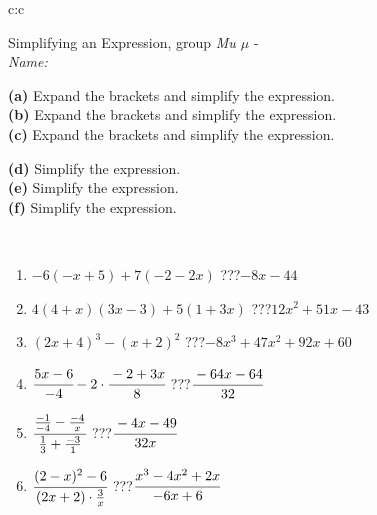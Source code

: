 \documentclass[10pt]{report}
\begin{document}
\newpage
\thispagestyle{empty}
\begin{tabular}{c:c}
\begin{minipage}[c][104.5mm][t]{0.5\linewidth}
\begin{center}
\vspace{7mm}
{\huge Simplifying an Expression, group \textit{Mu $\mu$} -}\\[5mm]
\textit{Name:}\phantom{xxxxxxxxxxxxxxxxxxxxxxxxxxxxxxxxxxxxxxxxxxxxxxxxxxxxxxxxxxxxxxxxx}\\[5mm]
\begin{minipage}{0.95\linewidth}
\begin{center}
{\small \begin{minipage}{0.6\textwidth}
\textbf{(a)} Expand the brackets and simplify the expression. \\[1mm]
\textbf{(b)} Expand the brackets and simplify the expression. \\[1mm]
\textbf{(c)} Expand the brackets and simplify the expression.
\end{minipage} \begin{minipage}{0.39\textwidth}
\textbf{(d)} Simplify the expression. \\[1mm]
\textbf{(e)} Simplify the expression. \\[1mm]
\textbf{(f)} Simplify the expression.
\end{minipage}
}
\end{center}
\end{minipage}
\\[4mm]
\begin{minipage}{0.79\linewidth}
\begin{center}
\begin{varwidth}{\linewidth}
\begin{enumerate}
\normalsize
\item $-6(-x+5)+7(-2-2x)$\quad \dotfill\; ???\;\dotfill \quad $-8x-44$
\item $4(4+x)(3x-3)+5(1+3x)$\quad \dotfill\; ???\;\dotfill \quad $12x^2+51x-43$
\item $(2x+4)^3-(x+2)^2$\quad \dotfill\; ???\;\dotfill \quad $-8x^3+47x^2+92x+60$
\item $\cfrac{5x-6}{-4}-2\cdot\cfrac{-2+3x}{8}$\quad \dotfill\; ???\;\dotfill \quad $\cfrac{-64x-64}{32}$
\item $\cfrac{\frac{-1}{-4}-\frac{-4}{x}}{\frac{1}{3}+\frac{-3}{1}}$\quad \dotfill\; ???\;\dotfill \quad $\cfrac{-4x-49}{32x}$
\item $\cfrac{(2-x)^2-6}{(2x+2)\cdot\frac{3}{x}}$\quad \dotfill\; ???\;\dotfill \quad $\cfrac{x^3-4x^2+2x}{-6x+6}$

\end{enumerate}
\end{varwidth}
\end{center}
\end{minipage}
\end{center}
\end{minipage}
\end{tabular}
\end{document}
